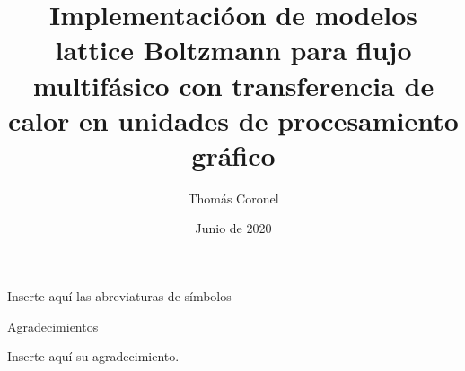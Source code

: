 \documentclass[12pt,papel,oneside]{ibtesis}
\title{Implementacióon de modelos lattice Boltzmann para flujo multifásico con transferencia de calor en unidades de procesamiento gráfico}
\author{Thomás Coronel}
\date{Junio de 2020}
\begin{document}

\begin{preliminary}





\tableofcontents                %

\begin{abreviaturas}
	
	Inserte aquí las abreviaturas de símbolos
	
\end{abreviaturas}

\end{preliminary}









\appendix
%




\begin{biblio}

\end{biblio}


\begin{postliminary}

\listoffigures                  %

\listoftables                   %

\begin{seccion}{Agradecimientos}
\begin{small}	

Inserte aquí su agradecimiento.

\end{small}


\end{seccion}


\end{postliminary}
\end{document}
